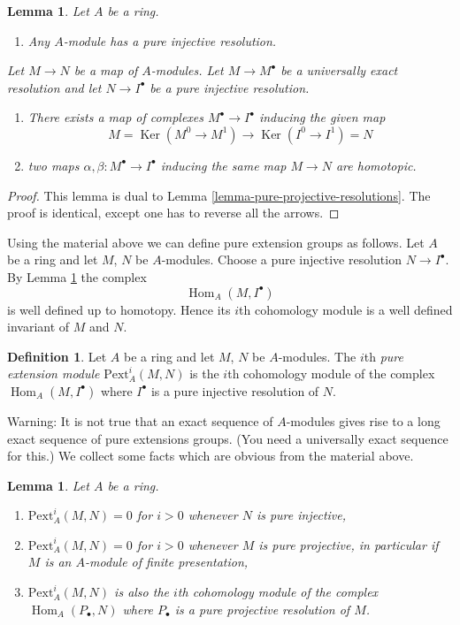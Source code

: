 \documentclass{stacks-project}
\theoremstyle{plain}
\newtheorem{lemma}[subsection]{Lemma}
\theoremstyle{definition}
\newtheorem{definition}[subsection]{Definition}
\theoremstyle{remark}
\numberwithin{equation}{subsection}
\def\Hom{\mathop{\mathrm{Hom}}\nolimits}
\def\Ker{\mathop{\mathrm{Ker}}}
\begin{document}
\begin{lemma}
\label{lemma-pure-injective-resolutions}
Let $A$ be a ring.
\begin{enumerate}
\item Any $A$-module has a pure injective resolution.
\end{enumerate}
Let $M \to N$ be a map of $A$-modules.
Let $M \to M^\bullet$ be a universally exact resolution and
let $N \to I^\bullet$ be a pure injective resolution.
\begin{enumerate}
\item[(2)] There exists a map of complexes $M^\bullet \to I^\bullet$
inducing the given map
$$
M = \Ker(M^0 \to M^1) \to \Ker(I^0 \to I^1) = N
$$
\item[(3)] two maps $\alpha, \beta : M^\bullet \to I^\bullet$
inducing the same map $M \to N$ are homotopic.
\end{enumerate}
\end{lemma}

\begin{proof}
This lemma is dual to
Lemma \ref{lemma-pure-projective-resolutions}.
The proof is identical, except one has to reverse all the arrows.
\end{proof}

\noindent
Using the material above we can define pure extension groups as
follows. Let $A$ be a ring and let $M$, $N$ be $A$-modules.
Choose a pure injective resolution $N \to I^\bullet$. By
Lemma \ref{lemma-pure-injective-resolutions}
the complex
$$
\Hom_A(M, I^\bullet)
$$
is well defined up to homotopy. Hence its $i$th cohomology module
is a well defined invariant of $M$ and $N$.

\begin{definition}
\label{definition-pure-ext}
Let $A$ be a ring and let $M$, $N$ be $A$-modules.
The $i$th {\it pure extension module} $\text{Pext}^i_A(M, N)$
is the $i$th cohomology module of the complex
$\Hom_A(M, I^\bullet)$ where $I^\bullet$ is a pure injective
resolution of $N$.
\end{definition}

\noindent
Warning: It is not true that an exact sequence of $A$-modules gives
rise to a long exact sequence of pure extensions groups. (You need
a universally exact sequence for this.)
We collect some facts which are obvious from the material above.

\begin{lemma}
\label{lemma-facts-pext}
Let $A$ be a ring.
\begin{enumerate}
\item $\text{Pext}^i_A(M, N) = 0$ for $i > 0$ whenever $N$ is pure injective,
\item $\text{Pext}^i_A(M, N) = 0$ for $i > 0$ whenever $M$ is pure projective,
in particular if $M$ is an $A$-module of finite presentation,
\item $\text{Pext}^i_A(M, N)$ is also the $i$th cohomology module
of the complex $\Hom_A(P_\bullet, N)$ where $P_\bullet$
is a pure projective resolution of $M$.
\end{enumerate}
\end{lemma}
\end{document}
